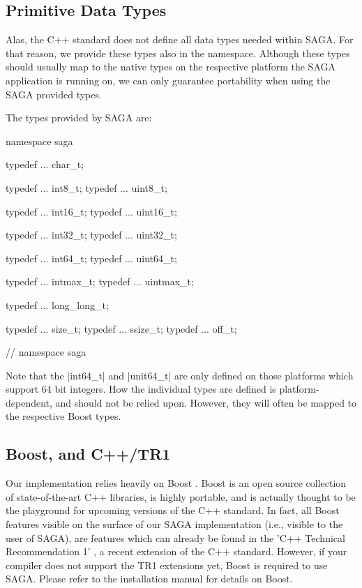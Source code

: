 
\subsection{Primitive Data Types}

 Alas, the C++ standard does not define all data types needed within
 SAGA.  For that reason, we provide these types also in the 
 namespace.  Although these types should usually map to the native
 types on the respective platform the SAGA application is running on,
 we can only guarantee portability when using the SAGA provided types.

 The types provided by SAGA are:

 \begin{mycode}[label=Primitive types in the saga namespace]
  namespace saga
  {
    typedef  ...   char_t;

    typedef  ...   int8_t;             
    typedef  ...   uint8_t;            

    typedef  ...   int16_t;            
    typedef  ...   uint16_t;           

    typedef  ...   int32_t;            
    typedef  ...   uint32_t;           

    typedef  ...   int64_t;            
    typedef  ...   uint64_t;           

    typedef  ...   intmax_t;      
    typedef  ...   uintmax_t;     

    typedef  ...   long_long_t;

    typedef  ...   size_t;
    typedef  ...   ssize_t;
    typedef  ...   off_t;
  
  } // namespace saga
 \end{mycode}

 Note that the |int64_t| and |unit64_t| are only defined on those
 platforms which support 64 bit integers.  How the individual types
 are defined is platform-dependent, and should not be relied upon.
 However, they will often be mapped to the respective Boost
 types.


\subsection{Boost, and C++/TR1}
 
 Our implementation relies heavily on Boost \cite{boost}.  Boost is
 an open source collection of state-of-the-art C++ libraries, is
 highly portable, and is actually thought to be the playground for
 upcoming versions of the C++ standard.  In fact, all Boost features
 visible on the surface of our SAGA implementation (i.e., visible to
 the user of SAGA), are features which can already be found in the
 'C++ Technical Recommendation 1' \cite{tr1}, a recent extension of the
 C++ standard.  However, if your compiler does not support the TR1
 extensions yet, Boost is required to use SAGA.  Please refer to the
 installation manual for details on Boost.


